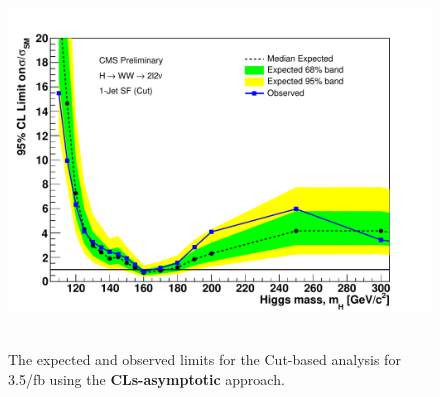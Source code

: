 \begin{figure}[!hbtp]
{\centering
\label{subfig:1jsf}
\includegraphics[width=.45\textwidth]{figures/limits_1jsf_cut-CLs-asymptotic.pdf}} \\
 \\
\label{fig:uls_cut}
\caption{The expected and observed limits for the Cut-based analysis for 3.5/fb using the {\bf CLs-asymptotic} approach. }
\end{figure}



